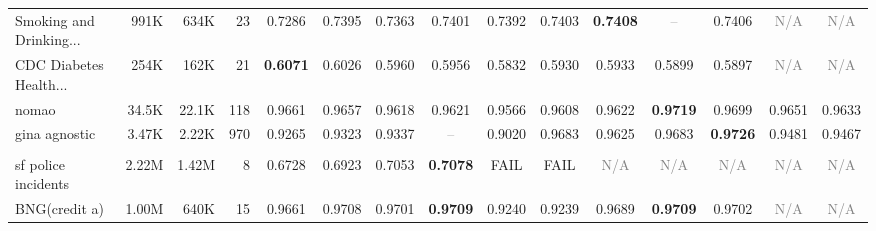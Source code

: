 \begin{table}[t]
{\begin{tabular}{lrrrccccccccccc}
Smoking and Drinking... & 991K & 634K & 23 & \cellcolor[HTML]{F4CCCC}0.7286 & \cellcolor[HTML]{E1ECD2}0.7395 & \cellcolor[HTML]{F5F0CE}0.7363 & \cellcolor[HTML]{DDEBD2}0.7401 & \cellcolor[HTML]{E3ECD1}0.7392 & \cellcolor[HTML]{DCEBD2}0.7403 & \cellcolor[HTML]{D9EAD3}\textbf{0.7408} & \textcolor{gray}{--} & \cellcolor[HTML]{DAEAD3}0.7406 & \textcolor{gray}{N/A} & \textcolor{gray}{N/A} \\
CDC Diabetes Health... & 254K & 162K & 21 & \cellcolor[HTML]{D9EAD3}\textbf{0.6071} & \cellcolor[HTML]{E7EDD0}0.6026 & \cellcolor[HTML]{FCF1CC}0.5960 & \cellcolor[HTML]{FEF2CC}0.5956 & \cellcolor[HTML]{F4CCCC}0.5832 & \cellcolor[HTML]{FDEBCC}0.5930 & \cellcolor[HTML]{FDECCC}0.5933 & \cellcolor[HTML]{FAE1CC}0.5899 & \cellcolor[HTML]{FAE1CC}0.5897 & \textcolor{gray}{N/A} & \textcolor{gray}{N/A} \\
nomao & 34.5K & 22.1K & 118 & \cellcolor[HTML]{F6F0CE}0.9661 & \cellcolor[HTML]{F8F0CD}0.9657 & \cellcolor[HTML]{FBE6CC}0.9618 & \cellcolor[HTML]{FCE7CC}0.9621 & \cellcolor[HTML]{F4CCCC}0.9566 & \cellcolor[HTML]{FAE1CC}0.9608 & \cellcolor[HTML]{FCE8CC}0.9622 & \cellcolor[HTML]{D9EAD3}\textbf{0.9719} & \cellcolor[HTML]{E3ECD1}0.9699 & \cellcolor[HTML]{FBF1CD}0.9651 & \cellcolor[HTML]{FEEDCC}0.9633 \\
gina agnostic & 3.47K & 2.22K & 970 & \cellcolor[HTML]{FCE6CC}0.9265 & \cellcolor[HTML]{FDEDCC}0.9323 & \cellcolor[HTML]{FEEECC}0.9337 & \textcolor{gray}{--} & \cellcolor[HTML]{F4CCCC}0.9020 & \cellcolor[HTML]{DEEBD2}0.9683 & \cellcolor[HTML]{E4ECD1}0.9625 & \cellcolor[HTML]{DEEBD2}0.9683 & \cellcolor[HTML]{D9EAD3}\textbf{0.9726} & \cellcolor[HTML]{F3F0CE}0.9481 & \cellcolor[HTML]{F5F0CE}0.9467 \\
\addlinespace[2pt]
\rowcolor{gray!15}
\multicolumn{15}{l}{\textbf{ROC--AUC}} \\
sf police incidents & 2.22M & 1.42M & 8 & \cellcolor[HTML]{F4CCCC}0.6728 & \cellcolor[HTML]{FBF1CD}0.6923 & \cellcolor[HTML]{DEEBD2}0.7053 & \cellcolor[HTML]{D9EAD3}\textbf{0.7078} & \textcolor{red!70!black}{FAIL} & \textcolor{red!70!black}{FAIL} & \textcolor{gray}{N/A} & \textcolor{gray}{N/A} & \textcolor{gray}{N/A} & \textcolor{gray}{N/A} & \textcolor{gray}{N/A} \\
BNG(credit a) & 1.00M & 640K & 15 & \cellcolor[HTML]{E1ECD2}0.9661 & \cellcolor[HTML]{D9EAD3}0.9708 & \cellcolor[HTML]{DAEAD3}0.9701 & \cellcolor[HTML]{D9EAD3}\textbf{0.9709} & \cellcolor[HTML]{F4CCCC}0.9240 & \cellcolor[HTML]{F4CCCC}0.9239 & \cellcolor[HTML]{DCEBD2}0.9689 & \cellcolor[HTML]{D9EAD3}\textbf{0.9709} & \cellcolor[HTML]{DAEAD3}0.9702 & \textcolor{gray}{N/A} & \textcolor{gray}{N/A} \\

\end{tabular}}
\end{table}

